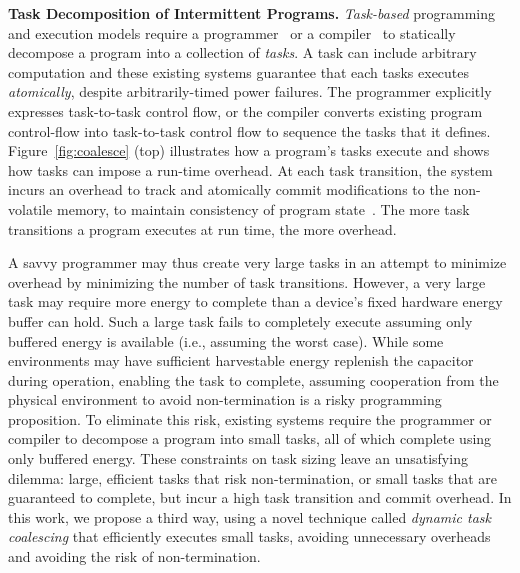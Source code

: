 

\textbf{Task Decomposition of Intermittent Programs.} {\em
Task-based} programming and execution models require a
programmer~\citep{alpaca,chain} or a compiler~\cite{baghsorkhi_cgo_2018} to
statically decompose a program into a collection of {\em tasks}.  A task can
include arbitrary computation and these existing systems guarantee that each
tasks executes {\em atomically}, despite arbitrarily-timed power failures.  
%
The programmer explicitly expresses task-to-task control flow, or the compiler
converts existing program control-flow into task-to-task control flow to sequence 
the tasks that it defines.
%
Figure~\ref{fig:coalesce} (top) illustrates how a program's tasks execute and
shows how tasks can impose a run-time overhead. 
%
At each task transition, the system incurs an overhead to track and atomically
commit modifications to the non-volatile memory, to maintain consistency of
program state~\citep{chain,alpaca}.  
%
The more task transitions a program executes at run time, the more overhead.

A savvy programmer may thus create very large tasks in an attempt to
minimize overhead by minimizing the number of task transitions.  However, a
very large task may require more energy to complete than a device's fixed
hardware energy buffer can hold.  Such a large task fails to completely execute
assuming only buffered energy is available (i.e., assuming the worst case).
While some environments may have sufficient harvestable energy replenish the
capacitor during operation, enabling the task to complete, assuming cooperation
from the physical environment to avoid non-termination is a risky programming
proposition.  To eliminate this risk, existing systems require the programmer
or compiler to decompose a  program into small tasks, all of which complete
using only buffered energy.  These constraints on task sizing leave an
unsatisfying dilemma: large, efficient tasks that risk non-termination, or
small tasks that are guaranteed to complete, but incur a high task transition
and commit overhead.  In this work, we propose a third way, using a novel
technique called {\em dynamic task coalescing} that efficiently executes small
tasks, avoiding unnecessary overheads and avoiding the risk of non-termination.

